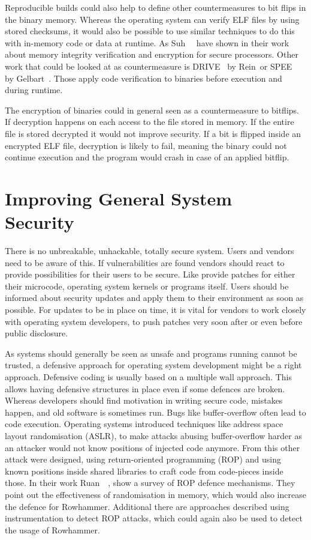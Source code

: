 Reproducible builds could also help to define other countermeasures to bit flips
in the binary memory. Whereas the operating system can verify ELF files by using
stored checksums, it would also be possible to use similar techniques to do this
with in-memory code or data at runtime. As Suh~\etal~\cite{memintegrity} have
shown in their work about memory integrity verification and encryption for
secure processors. Other work that could be looked at as countermeasure is
DRIVE~\cite{drive} by Rein~\etal or SPEE~\cite{spee} by Gelbart~\etal. Those apply
code verification to binaries before execution and during runtime.

The encryption of binaries could in general seen as a countermeasure to
bitflips. If decryption happens on each access to the file stored in memory. If
the entire file is stored decrypted it would not improve security. If a bit is
flipped inside an encrypted ELF file, decryption is likely to fail, meaning the
binary could not continue execution and the program would crash in case of an
applied bitflip.

\section{Improving General System Security}

There is no unbreakable, unhackable, totally secure system. Users and vendors
need to be aware of this. If vulnerabilities are found vendors should react to
provide possibilities for their users to be secure. Like provide patches for
either their microcode, operating system kernels or programs itself. Users
should be informed about security updates and apply them to their environment
as soon as possible. For updates to be in place on time, it is vital for
vendors to work closely with operating system developers, to push patches very
soon after or even before public disclosure.

As systems should generally be seen as unsafe and programs running cannot be
trusted, a defensive approach for operating system development might be a right
approach. Defensive coding is usually based on a multiple wall approach. This
allows having defensive structures in place even if some defences are broken.
Whereas developers should find motivation in writing secure code, mistakes
happen, and old software is sometimes run. Bugs like buffer-overflow often lead
to code execution. Operating systems introduced techniques like address space
layout randomisation (ASLR), to make attacks abusing buffer-overflow harder as
an attacker would not know positions of injected code anymore. From this other
attack were designed, using return-oriented programming (ROP) and using known
positions inside shared libraries to craft code from code-pieces inside those.
In their work Ruan~\etal~\cite{ropsur}, show a survey of ROP defence mechanisms.
They point out the effectiveness of randomisation in memory, which would also
increase the defence for Rowhammer. Additional there are approaches described
using instrumentation to detect ROP attacks, which could again also be used to
detect the usage of Rowhammer.

